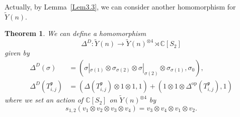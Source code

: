 \documentclass{article}
\newtheorem{Theorem}[equation]{Theorem}
\theoremstyle{definition}
\theoremstyle{remark}
\numberwithin{equation}{section}
\numberwithin{equation}{section}
\begin{document}
Actually, by Lemma~\ref{Lem3.3}, we can consider another homomorphism for $\widetilde{Y}(n)$.
\begin{Theorem}\label{DD}
We can define a homomorphism 
\[
\Delta^D\colon \widetilde{Y}(n)\to\widetilde{Y}(n)^{\otimes 4}\rtimes\mathbb{C}[S_2]
\]
given by
\begin{align*}
\Delta^D(\sigma)&=(\sigma|_{\sigma(1)}\otimes\sigma_{\sigma(2)}\otimes \sigma|_{\sigma(2)}\otimes\sigma_{\sigma(1)},\sigma_0),\\
\Delta^D(T^{\mathfrak{p}}_{i,j})&=(\Delta(T^{\mathfrak{p}}_{i,j})\otimes1\otimes1,1)+(1\otimes1\otimes\Delta^{\text{op}}(T^{\mathfrak{p}}_{i,j}),1)
\end{align*}
where we set an action of $\mathbb{C}[S_2]$ on $\widetilde{Y}(n)^{\otimes 4}$ by
\[
s_{1,2}(v_1\otimes v_2\otimes v_3\otimes v_4)=v_3\otimes v_4\otimes v_1\otimes v_2.
\]
\end{Theorem}
\end{document}
